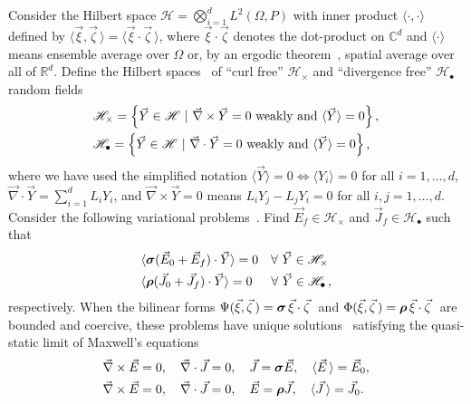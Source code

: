 \documentclass{cmslatex}
\newcommand\bsig{\mbox{\boldmath${\sigma}$}}
\newcommand\brho{\mbox{\boldmath${\rho}$}}
\begin{document}
Consider the Hilbert space $\mathscr{H}=\bigotimes_{i=1}^dL^2(\Omega,P)$ with inner
product $\langle\cdot,\cdot\rangle$ defined by $\langle\vec{\xi},\vec{\zeta}\,\rangle=\langle\vec{\xi}\cdot\vec{\zeta}\,\rangle$, where
$\vec{\xi}\cdot\vec{\zeta}$ denotes the dot-product on $\mathbb{C}^d$ and
$\langle\cdot\rangle$ means ensemble average over $\Omega$ or, by an ergodic
theorem~\cite{Golden:CMP-473}, spatial average over all of 
${\mathbb{R}}^d$. Define the Hilbert spaces~\cite{Golden:CMP-473} of
``curl free'' $\mathscr{H}_\times$ and ``divergence free''
$\mathscr{H}_{\bullet}$ random fields   
%
\begin{align}\label{eq:curlfreeHilbert}
  &\mathscr{H}_\times=
  \left\{\vec{Y}\in \mathscr{H} \ | \ \vec{\nabla} \times\vec{Y}=0 \text{~weakly and~}
    \langle\vec{Y}\rangle=0
  \right\}, \\
&\mathscr{H}_{\bullet}=
\left\{\vec{Y}\in \mathscr{H} \ | \ \vec{\nabla}\cdot\vec{Y}=0 \text{~weakly and~}
    \langle\vec{Y}\rangle=0\right\},\notag 
\end{align}  
%
where we have used the simplified notation $\langle\vec{Y}\rangle=0 \iff \langle Y_i\rangle=0$ for
all $i=1,\ldots,d$, $\vec{\nabla}\cdot\vec{Y}=\sum_{i=1}^dL_iY_i$, and $\vec{\nabla} \times\vec{Y}=0$
means $L_iY_j-L_jY_i=0$ for all $i,j=1,\ldots,d$. Consider the following
variational problems~\cite{Golden:CMP-473}. Find
$\vec{E}_f\in\mathscr{H}_\times$ and $\vec{J}_f\in\mathscr{H}_\bullet$ such that     
%
\begin{align}
 \label{eq:Weak_Curl_Free_Variational_Form}
 &\langle\bsig(\vec{E}_0+\vec{E}_f)\cdot\vec{Y}\rangle=0 \quad
 \forall \  \vec{Y}\in\mathscr{H}_\times 
\\
 &\langle\brho(\vec{J}_0+\vec{J}_f)\cdot\vec{Y}\rangle=0 \quad
 \hspace{0.5em}\forall \ \vec{Y}\in\mathscr{H}_{\bullet}\,,
  \notag
\end{align}
%
respectively. When the bilinear forms
$\Psi(\vec{\xi},\vec{\zeta}\,)=\bsig\,\vec{\xi}\cdot\vec{\zeta}\;$ and
$\Phi(\vec{\xi},\vec{\zeta}\,)=\brho\,\vec{\xi}\cdot\vec{\zeta}\;$ are bounded and
coercive, these problems have unique
solutions~\cite{Golden:CMP-473,Papanicolaou:RF-835} satisfying the
quasi-static 
limit of Maxwell's equations ~\cite{Jackson-1999} 
%
\begin{align}   \label{eq:Maxwells_Equations_E}  
 &\vec{\nabla}\times\vec{E}=0, \quad
  \vec{\nabla}\cdot\vec{J}=0,\quad
  \vec{J}=\bsig\vec{E},\quad
  \langle\vec{E}\,\rangle=\vec{E}_0, \\
%
   &\vec{\nabla}\times\vec{E}=0, \quad
   \vec{\nabla}\cdot\vec{J}=0, \quad
   \vec{E}=\brho\vec{J},\quad
   \langle\vec{J}\,\rangle=\vec{J}_0.
   \notag  
\end{align}
\end{document}
